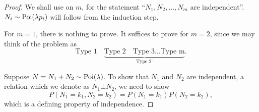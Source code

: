 \documentclass[notoc,notitlepage]{tufte-book}
\begin{document}
\begin{proof}
  We shall use  on $m$, for the statement ``$N_1, N_2, \ldots, N_m$ are independent''. $N_i \sim \operatorname{Poi}(\lambda p_i)$ will follow from the induction step.

  For $m = 1$, there is nothing to prove. It suffices to prove for $m = 2$, since we may think of the problem as
  \begin{equation*}
    \text{Type 1} \quad \underbrace{\text{Type 2} \quad \text{Type 3} \hdots \text{Type m}}_{\text{Type 2'}}.
  \end{equation*}

  \noindent{} Suppose $N = N_1 + N_2 \sim \operatorname{Poi}(\lambda)$. To show that $N_1$ and $N_2$ are independent, a relation which we denote as $N_1 \bot N_2$, we need to show
  \begin{equation}\label{eq:splitting_poisson_independence}
    P(N_1 = k_1, N_2 = k_2) = P(N_1 = k_1) P(N_2 = k_2),
  \end{equation}
  which is a defining property of independence.


\end{proof}
\end{document}
